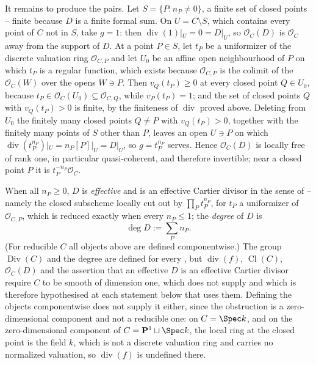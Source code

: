 \begin{definition}
It remains to produce the pairs.  Let \(S=\{P:n_P\neq0\}\), a finite
set of closed points -- finite because \(D\) is a finite formal sum.
On \(U=C\setminus S\), which contains every point of \(C\) not in
\(S\), take \(g=1\): then \(\operatorname{div}(1)|_U=0=D|_U\), so
\(\mathcal O_C(D)\) is \(\mathcal O_C\) away from the support of
\(D\).  At a point \(P\in S\), let \(t_P\) be a uniformizer of the
discrete valuation ring \(\mathcal O_{C,P}\) and let \(U_0\) be an
affine open neighbourhood of \(P\) on which \(t_P\) is a regular
function, which exists because \(\mathcal O_{C,P}\) is the colimit of
the \(\mathcal O_C(W)\) over the opens \(W\ni P\).  Then
\(v_Q(t_P)\geq0\) at every closed point \(Q\in U_0\), because
\(t_P\in\mathcal O_C(U_0)\subseteq\mathcal O_{C,Q}\), while
\(v_P(t_P)=1\); and the set of closed points \(Q\) with
\(v_Q(t_P)>0\) is finite, by the finiteness of \(\operatorname{div}\)
proved above.  Deleting from \(U_0\) the finitely many closed points
\(Q\neq P\) with \(v_Q(t_P)>0\), together with the finitely many
points of \(S\) other than \(P\), leaves an open \(U\ni P\) on which
\(\operatorname{div}(t_P^{n_P})|_U=n_P[P]|_U=D|_U\), so
\(g=t_P^{n_P}\) serves.  Hence \(\mathcal O_C(D)\) is locally free of
rank one, in particular quasi-coherent, and therefore invertible; near
a closed point \(P\) it is \(t_P^{-n_P}\mathcal O_C\).

When all \(n_P\geq0\), \(D\) is \emph{effective} and is an effective
Cartier divisor in the sense of
 --
namely the closed subscheme locally cut out by \(\prod_Pt_P^{n_P}\),
for \(t_P\) a uniformizer of \(\mathcal O_{C,P}\), which is reduced
exactly when every \(n_P\leq1\); the
\emph{degree} of \(D\) is
\[
 \deg D:=\sum_Pn_P.
\]
(For reducible \(C\) all objects above are defined componentwise.)
The group \(\operatorname{Div}(C)\) and the degree are defined for
every , but \(\operatorname{div}(f)\),
\(\operatorname{Cl}(C)\), \(\mathcal O_C(D)\) and the assertion that
an effective \(D\) is an effective Cartier divisor require \(C\) to be
smooth of dimension one, which  does not supply
and which is therefore hypothesised at each statement below that uses
them.  Defining the objects componentwise does not supply it either,
since the obstruction is a zero-dimensional component and not a
reducible one: on \(C=\Spec k\), and on the zero-dimensional component
of \(C=\mathbf P^1\sqcup\Spec k\), the local ring at the closed point
is the field \(k\), which is not a discrete valuation ring and carries
no normalized valuation, so \(\operatorname{div}(f)\) is undefined
there.
\end{definition}

